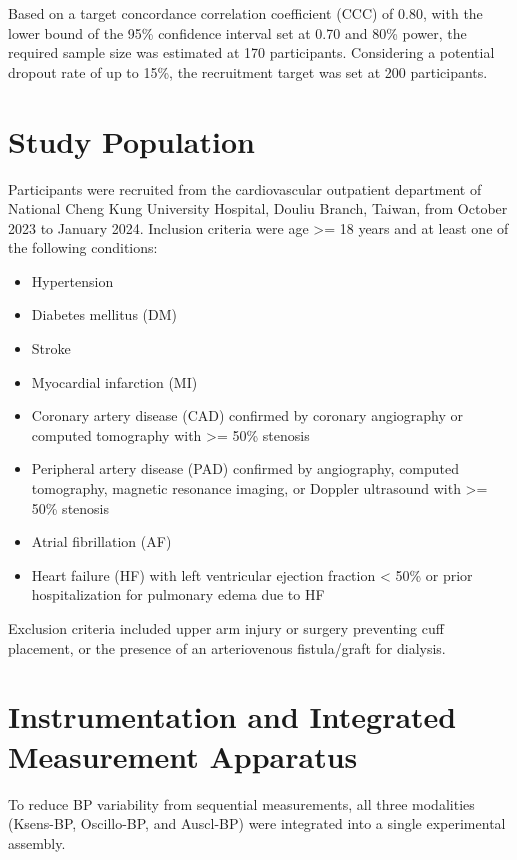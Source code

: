 \documentclass[
  12pt,
  letterpaper,
  openany,
  oneside]{book}
\providecommand{\tightlist}{%
  \setlength{\itemsep}{0pt}\setlength{\parskip}{0pt}}
\begin{document}
Based on a target concordance correlation coefficient (CCC) of 0.80,
with the lower bound of the 95\% confidence interval set at 0.70 and
80\% power, the required sample size was estimated at 170 participants.
Considering a potential dropout rate of up to 15\%, the recruitment
target was set at 200 participants.

\section{Study Population}\label{study-population}

Participants were recruited from the cardiovascular outpatient
department of National Cheng Kung University Hospital, Douliu Branch,
Taiwan, from October 2023 to January 2024. Inclusion criteria were age
\textgreater= 18 years and at least one of the following conditions:

\begin{itemize}
\tightlist
\item
  Hypertension
\item
  Diabetes mellitus (DM)
\item
  Stroke
\item
  Myocardial infarction (MI)
\item
  Coronary artery disease (CAD) confirmed by coronary angiography or
  computed tomography with \textgreater= 50\% stenosis
\item
  Peripheral artery disease (PAD) confirmed by angiography, computed
  tomography, magnetic resonance imaging, or Doppler ultrasound with
  \textgreater= 50\% stenosis
\item
  Atrial fibrillation (AF)
\item
  Heart failure (HF) with left ventricular ejection fraction \textless{}
  50\% or prior hospitalization for pulmonary edema due to HF
\end{itemize}

Exclusion criteria included upper arm injury or surgery preventing cuff
placement, or the presence of an arteriovenous fistula/graft for
dialysis.

\section{Instrumentation and Integrated Measurement
Apparatus}\label{instrumentation-and-integrated-measurement-apparatus}

To reduce BP variability from sequential measurements, all three
modalities (Ksens-BP, Oscillo-BP, and Auscl-BP) were integrated into a
single experimental assembly.
\end{document}
